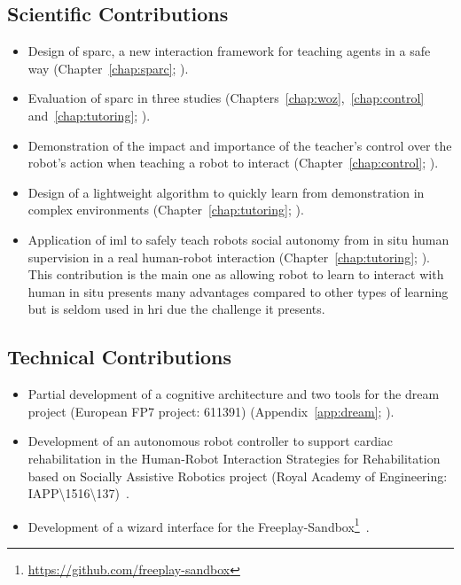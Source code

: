 \subsection{Scientific Contributions}
\begin{itemize}
	\item Design of \gls{sparc}, a new interaction framework for teaching agents in a safe way (Chapter~\ref{chap:sparc}; \citealt{senft2015human,senft2015sparc}).
	\item Evaluation of \gls{sparc} in three studies (Chapters~\ref{chap:woz},~\ref{chap:control} and~\ref{chap:tutoring}; \citealt{senft2015sparc,senft2017supervised,senft2018robots}).
	\item Demonstration of the impact and importance of the teacher's control over the robot's action when teaching a robot to interact (Chapter~\ref{chap:control}; \citealt{senft2016sparc,senft2017supervised}).
	\item Design of a lightweight algorithm to quickly learn from demonstration in complex environments (Chapter~\ref{chap:tutoring}; \citealt{senft2017toward}).
	\item Application of \gls{iml} to safely teach robots social autonomy from in situ human supervision in a real human-robot interaction (Chapter~\ref{chap:tutoring}; \citealt{senft2018robots}). This contribution is the main one as allowing robot to learn to interact with human in situ presents many advantages compared to other types of learning but is seldom used in \gls{hri} due the challenge it presents.
\end{itemize}

\subsection{Technical Contributions}
\begin{itemize}
	\item Partial development of a cognitive architecture and two tools for the \acrshort{dream} project (European FP7 project: 611391) (Appendix~\ref{app:dream}; \citealt{esteban2017build}).
	\item Development of an autonomous robot controller to support cardiac rehabilitation in the Human-Robot Interaction Strategies for Rehabilitation based on Socially Assistive Robotics project (Royal Academy of Engineering: IAPP\textbackslash1516\textbackslash137)~\citep{lara2017human,casas2018social}.
	\item Development of a wizard interface for the Freeplay-Sandbox\footnote{\url{https://github.com/freeplay-sandbox}}~\citep{lemaignan2017free}.
\end{itemize}
	
